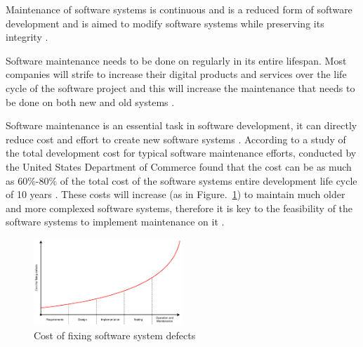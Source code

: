 Maintenance of software systems is continuous and is a reduced form of software development and is aimed to modify software systems while preserving its integrity \cite{Sneed2004,Ackermann2009}.\par Software maintenance needs to be done on regularly in its entire lifespan. Most companies will strife to increase their digital products and services over the life cycle of the software project and this will increase the maintenance that needs to be done on both new and old systems \cite{Niu2018, Galster2019,Hasan2012}. \par Software maintenance is an essential task in software development, it can directly reduce cost and effort to create new software systems \cite{FrancisThamburaj2017}. According to a study of the total development cost for typical software maintenance efforts, conducted by the United States Department of Commerce found that the cost can be as much as $60\%$-$80\%$ of the total cost of the software systems entire development life cycle of 10 years \cite{Ogheneovo2014, Stark1996,Ackermann2009}. These costs will increase (as in Figure.~\ref{fig:CH1_Costs_of_fixing_bugs}) to maintain much older and more complexed software systems, therefore it is key to the feasibility of the software systems to implement maintenance on it \cite{Alenezi2016, Booch1986}.

\begin{figure}[h!] %
    \centering %
    \includegraphics[width=0.5\textwidth]{Images/Chapter1/Background/Cost_of_fixing_bugs/Cost_of_fixing_bugs.pdf}
    \caption{Cost of fixing software system defects \cite{Ogheneovo2014}}\label{fig:CH1_Costs_of_fixing_bugs}
\end{figure} 

